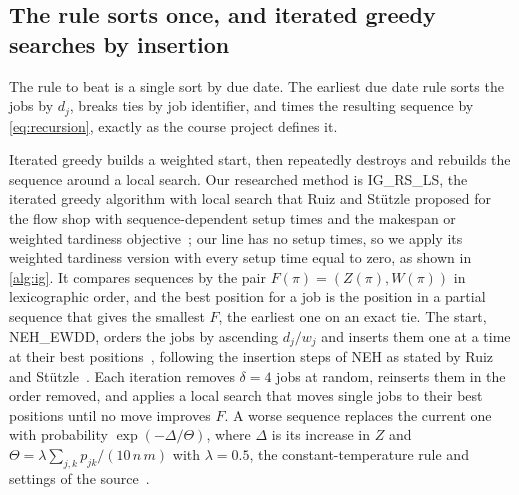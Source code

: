 \subsection{The rule sorts once, and iterated greedy searches by insertion}\label{sec:methods}

\sumpara The rule to beat is a single sort by due date. \sumparaend
\fin The earliest due date rule sorts the jobs by $d_j$, breaks ties by job identifier, and times the resulting sequence by \eqref{eq:recursion}, exactly as the course project defines it. \fine

\sumpara Iterated greedy builds a weighted start, then repeatedly destroys and rebuilds the sequence around a local search. \sumparaend
\fin Our researched method is IG\_RS\_LS, the iterated greedy algorithm with local search that Ruiz and St\"utzle proposed for the flow shop with sequence-dependent setup times and the makespan or weighted tardiness objective~\cite{ruiz2008igwt}; our line has no setup times, so we apply its weighted tardiness version with every setup time equal to zero, as shown in \cref{alg:ig}. \fine
\fin It compares sequences by the pair $F(\pi) = (Z(\pi), W(\pi))$ in lexicographic order, and the best position for a job is the position in a partial sequence that gives the smallest $F$, the earliest one on an exact tie. \fine
\fin The start, NEH\_EWDD, orders the jobs by ascending $d_j / w_j$ and inserts them one at a time at their best positions~\cite{ruiz2008igwt}, following the insertion steps of NEH as stated by Ruiz and St\"utzle~\cite{ruiz2007ig}. \fine
\fin Each iteration removes $\delta = 4$ jobs at random, reinserts them in the order removed, and applies a local search that moves single jobs to their best positions until no move improves $F$. \fine
\fin A worse sequence replaces the current one with probability $\exp(-\Delta/\Theta)$, where $\Delta$ is its increase in $Z$ and $\Theta = \lambda \sum_{j,k} p_{jk} / (10\, n\, m)$ with $\lambda = 0.5$, the constant-temperature rule and settings of the source~\cite{ruiz2008igwt}. \fine

